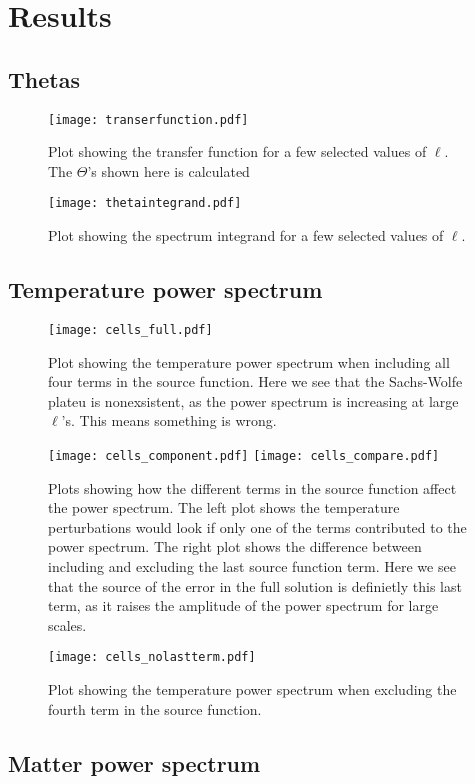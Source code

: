 \documentclass[12pt]{article}
\begin{document}
\section{Results}
\subsection{Thetas}

\begin{figure}[h]
    \centering
    \texttt{[image: transerfunction.pdf]} 
    \label{fig:transferfunction}
    \caption{Plot showing the transfer function for a few selected values of $\ell$. The $\Theta$'s shown here is calculated }
\end{figure}

\begin{figure}[h]
    \centering
    \texttt{[image: thetaintegrand.pdf]} 
    \label{fig:spectrum integrand}
    \caption{Plot showing the spectrum integrand for a few selected values of $\ell$.}
\end{figure}


\subsection{Temperature power spectrum}

\begin{figure}[h]
    \centering
    \texttt{[image: cells\_full.pdf]} 
    \label{fig:cell full}
    \caption{Plot showing the temperature power spectrum when including all four terms in the source function. Here we see that the Sachs-Wolfe plateu is nonexsistent, as the power spectrum is increasing at large $\ell$'s. This means something is wrong.}
\end{figure}

\begin{figure}[h]
    \centering
    \texttt{[image: cells\_component.pdf]}
    \texttt{[image: cells\_compare.pdf]}  
    \label{fig:cell debugging}
    \caption{Plots showing how the different terms in the source function affect the power spectrum. The left plot shows the temperature perturbations would look if only one of the terms contributed to the power spectrum. The right plot shows the difference between including and excluding the last source function term. Here we see that the source of the error in the full solution is definietly this last term, as it raises the amplitude of the power spectrum for large scales.}
\end{figure}

\begin{figure}[h]
    \centering
    \texttt{[image: cells\_nolastterm.pdf]} 
    \label{fig:cell debugging}
    \caption{Plot showing the temperature power spectrum when excluding the fourth term in the source function.}
\end{figure}

\subsection{Matter power spectrum}

{}

\end{document}
